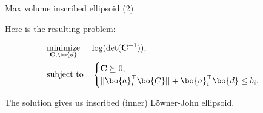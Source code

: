 \documentclass{beamer}
\begin{document}
\begin{frame}{Max volume inscribed ellipsoid (2)}
	\begin{flushleft}
		
		Here is the resulting problem:
		
		\begin{equation}
			\begin{aligned}
				& \underset{\mathbf{C}, \bo{d}}{\text{minimize}}
				& & \text{log} (\text{det} (\mathbf{C}^{-1}) ), \\
				& \text{subject to}
				& & \begin{cases}
					\mathbf{C} \succeq 0, \\
					|| \bo{a}_i^\top \bo{C} || + \bo{a}_i^\top\bo{d} \leq b_i.
				\end{cases}
			\end{aligned}
		\end{equation}
		
		The solution gives us inscribed (inner) L\"owner-John ellipsoid.
		
	\end{flushleft}
\end{frame}




\myqrframe
\end{document}
